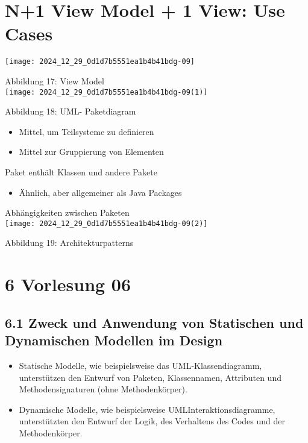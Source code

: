 \section*{N+1 View Model + 1 View: Use Cases}
\begin{center}
\texttt{[image: 2024\_12\_29\_0d1d7b5551ea1b4b41bdg-09]}
\end{center}

Abbildung 17: View Model\\
\texttt{[image: 2024\_12\_29\_0d1d7b5551ea1b4b41bdg-09(1)]}

Abbildung 18: UML- Paketdiagram

\begin{itemize}
  \item Mittel, um Teilsysteme zu definieren
  \item Mittel zur Gruppierung von Elementen
\end{itemize}

Paket enthält Klassen und andere Pakete

\begin{itemize}
  \item Ähnlich, aber allgemeiner als Java Packages
\end{itemize}

Abhängigkeiten zwischen Paketen\\
\texttt{[image: 2024\_12\_29\_0d1d7b5551ea1b4b41bdg-09(2)]}

Abbildung 19: Architekturpatterns

\section*{6 Vorlesung 06}
\subsection*{6.1 Zweck und Anwendung von Statischen und Dynamischen Modellen im Design}
\begin{itemize}
  \item Statische Modelle, wie beispielsweise das UML-Klassendiagramm, unterstützen den Entwurf von Paketen, Klassennamen, Attributen und Methodensignaturen (ohne Methodenkörper).
  \item Dynamische Modelle, wie beispielsweise UMLInteraktionsdiagramme, unterstützten den Entwurf der Logik, des Verhaltens des Codes und der Methodenkörper.
\end{itemize}

